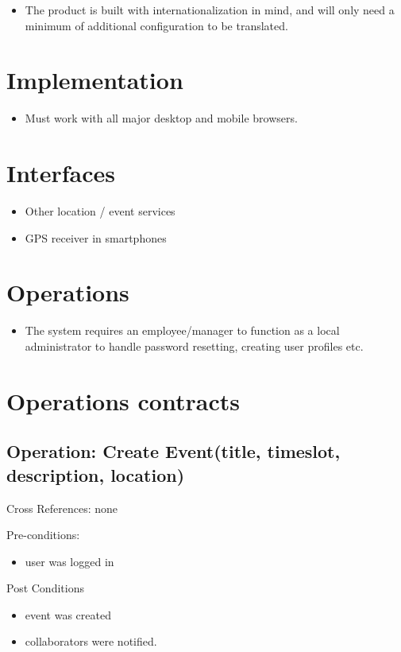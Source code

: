 \documentclass[10pt]{article}
\begin{document}
\begin{itemize}
\item The product is built with internationalization in mind, and will only need a minimum of additional configuration to be translated.
\end{itemize}


\section{Implementation}
\begin{itemize}
\item Must work with all major desktop and mobile browsers.
\end{itemize}

\section{Interfaces}

\begin{itemize}
\item Other location / event services
\item GPS receiver in smartphones
\end{itemize}

\section{Operations}
\begin{itemize}
\item The system requires an employee/manager to function as a local administrator to handle password resetting, creating user profiles etc.
\end{itemize}

\section{Operations contracts}
\subsection{Operation: Create Event(title, timeslot, description, location)}

Cross References: none

Pre-conditions:
\begin{itemize}
\item user was logged in
\end{itemize}

Post Conditions
\begin{itemize}
\item event was created
\item collaborators were notified.
\end{itemize}
\end{document}
